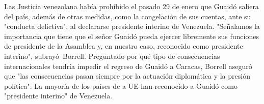 \documentclass{article}%
\begin{document}
\newline%
%
Las Justicia venezolana había prohibido el pasado 29 de enero que Guaidó saliera del país, además de otras medidas, como la congelación de sus cuentas, ante su "conducta delictiva", al declararse presidente interino de Venezuela.%
\newline%
%
"Señalamos la importancia que tiene que el señor Guaidó pueda ejercer libremente sus funciones de presidente de la Asamblea y, en nuestro caso, reconocido como presidente interino", subrayó~Borrell.%
\newline%
%
Preguntado por qué tipo de consecuencias internacionales tendría impedir el regreso de Guaidó a Caracas, Borrell aseguró que "las consecuencias pasan siempre por la actuación diplomática y la presión política".%
\newline%
%
La mayoría de los países de a UE han reconocido a Guaidó como "presidente interino" de Venezuela.%
\newline%
%
\end{document}
